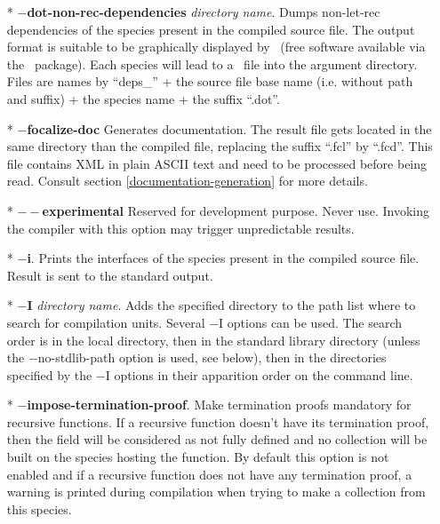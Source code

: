 \begin{itemize}
  \item[*] {\bf $-$dot-non-rec-dependencies} {\em directory name}.
    Dumps non-let-rec dependencies of the species present in the
    compiled source file. The output format is suitable to be
    graphically displayed by \dotty\ (free software available via the
    \graphviz\ package). Each species will lead to a \dotty\ file into
    the argument directory. Files are names by ``deps\_'' + the source
    file base name (i.e. without path and suffix) + the species name +
    the suffix ``.dot''.

  \item[*] {\bf $-$focalize-doc} Generates documentation. The
    result file gets located in the same directory than the compiled
    file, replacing the suffix ``.fcl'' by ``.fcd''. This file contains
    XML in plain ASCII text and need to be processed before being read.
    Consult section \ref{documentation-generation} for more details.

  \item[*] {\bf $--$experimental} Reserved for development purpose.
    Never use. Invoking the compiler with this option may trigger
    unpredictable results.

  \item[*] {\bf $-$i}. Prints the interfaces of the species present in
    the compiled source file. Result is sent to the standard output.

  \item[*] {\bf $-$I} {\em directory name}. Adds the specified
    directory to the path list where to search for
    compilation units. Several $-$I options can be used. The search order is
    in the local directory, then in the standard library directory (unless the
    $-$no-stdlib-path option is used, see below), then in the
    directories specified by the $-$I options in their apparition
    order on the command line.

  \item[*] {\bf $-$impose-termination-proof}. Make termination proofs
    mandatory for recursive functions. If a recursive function doesn't
    have its termination proof, then the field will be considered as
    not fully defined and no collection will be built on the
    species hosting the function. By default this option is not
    enabled and if a recursive function does not have any termination
    proof, a warning is printed during compilation when trying to make
    a collection from this species.


\end{itemize}
